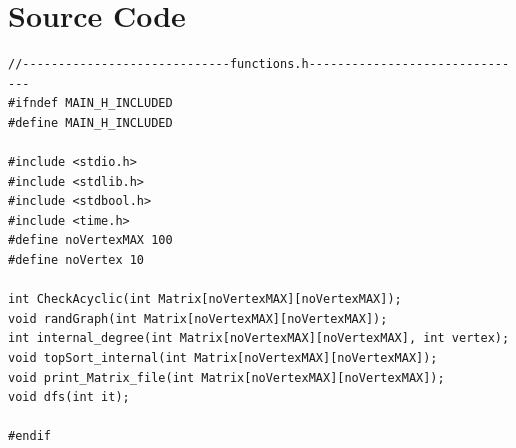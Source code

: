 \documentclass[14pt]{article}
\begin{document}
\section*{Source Code}
\begin{lstlisting}
//-----------------------------functions.h-------------------------------
#ifndef MAIN_H_INCLUDED
#define MAIN_H_INCLUDED

#include <stdio.h>
#include <stdlib.h>
#include <stdbool.h>
#include <time.h>
#define noVertexMAX 100
#define noVertex 10

int CheckAcyclic(int Matrix[noVertexMAX][noVertexMAX]);
void randGraph(int Matrix[noVertexMAX][noVertexMAX]);
int internal_degree(int Matrix[noVertexMAX][noVertexMAX], int vertex);
void topSort_internal(int Matrix[noVertexMAX][noVertexMAX]);
void print_Matrix_file(int Matrix[noVertexMAX][noVertexMAX]);
void dfs(int it);

#endif



\end{lstlisting}
\end{document}
